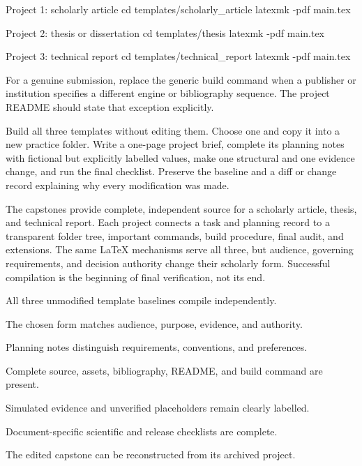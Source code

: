\begin{terminalcode}{Project 1: scholarly article}
cd templates/scholarly_article
latexmk -pdf main.tex
\end{terminalcode}

\begin{terminalcode}{Project 2: thesis or dissertation}
cd templates/thesis
latexmk -pdf main.tex
\end{terminalcode}

\begin{terminalcode}{Project 3: technical report}
cd templates/technical_report
latexmk -pdf main.tex
\end{terminalcode}

For a genuine submission, replace the generic build command when a publisher
or institution specifies a different engine or bibliography sequence. The
project README should state that exception explicitly.

\chapterproject

\begin{miniproject}
Build all three templates without editing them. Choose one and copy it into a
new practice folder. Write a one-page project brief, complete its planning
notes with fictional but explicitly labelled values, make one structural and
one evidence change, and run the final checklist. Preserve the baseline and a
diff or change record explaining why every modification was made.
\end{miniproject}

\chaptersummary

The capstones provide complete, independent source for a scholarly article,
thesis, and technical report. Each project connects a task and planning record
to a transparent folder tree, important commands, build procedure, final audit,
and extensions. The same \LaTeX{} mechanisms serve all three, but audience,
governing requirements, and decision authority change their scholarly form.
Successful compilation is the beginning of final verification, not its end.

\chaptercheck
\begin{chapterchecklist}
  \item All three unmodified template baselines compile independently.
  \item The chosen form matches audience, purpose, evidence, and authority.
  \item Planning notes distinguish requirements, conventions, and preferences.
  \item Complete source, assets, bibliography, README, and build command are present.
  \item Simulated evidence and unverified placeholders remain clearly labelled.
  \item Document-specific scientific and release checklists are complete.
  \item The edited capstone can be reconstructed from its archived project.
\end{chapterchecklist}

